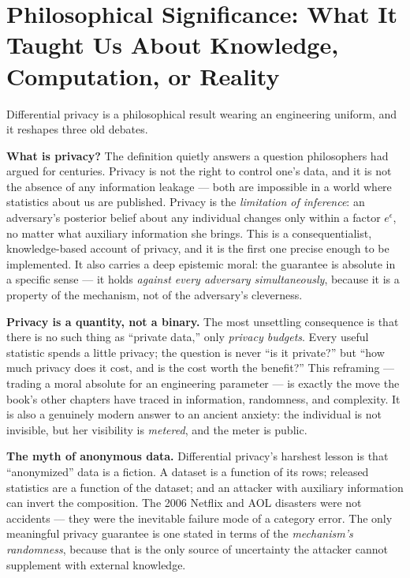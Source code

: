 \section{Philosophical Significance: What It Taught Us About Knowledge, Computation, or Reality}
\label{sec:dp:philosophy}

Differential privacy is a philosophical result wearing an engineering uniform, and it reshapes three old debates. 

\textbf{What is privacy?} The definition quietly answers a question philosophers had argued for centuries. Privacy is not the right to control one's data, and it is not the absence of any information leakage --- both are impossible in a world where statistics about us are published. Privacy is the \emph{limitation of inference}: an adversary's posterior belief about any individual changes only within a factor $e^{\epsilon}$, no matter what auxiliary information she brings. This is a consequentialist, knowledge-based account of privacy, and it is the first one precise enough to be implemented. It also carries a deep epistemic moral: the guarantee is absolute in a specific sense --- it holds \emph{against every adversary simultaneously}, because it is a property of the mechanism, not of the adversary's cleverness. 

\textbf{Privacy is a quantity, not a binary.} The most unsettling consequence is that there is no such thing as ``private data,'' only \emph{privacy budgets}. Every useful statistic spends a little privacy; the question is never ``is it private?'' but ``how much privacy does it cost, and is the cost worth the benefit?'' This reframing --- trading a moral absolute for an engineering parameter --- is exactly the move the book's other chapters have traced in information, randomness, and complexity. It is also a genuinely modern answer to an ancient anxiety: the individual is not invisible, but her visibility is \emph{metered}, and the meter is public. 

\textbf{The myth of anonymous data.} Differential privacy's harshest lesson is that ``anonymized'' data is a fiction. A dataset is a function of its rows; released statistics are a function of the dataset; and an attacker with auxiliary information can invert the composition. The 2006 Netflix and AOL disasters were not accidents --- they were the inevitable failure mode of a category error. The only meaningful privacy guarantee is one stated in terms of the \emph{mechanism's randomness}, because that is the only source of uncertainty the attacker cannot supplement with external knowledge.

